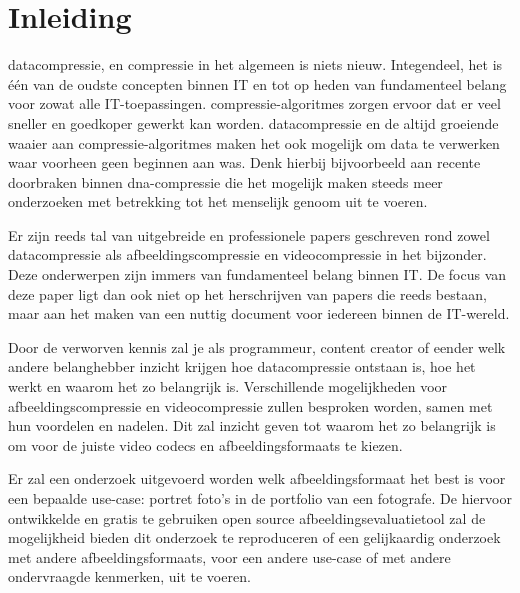 
\chapter{Inleiding}
\label{ch:inleiding}

\Gls{datacompressie}, en compressie in het algemeen is niets nieuw. Integendeel, het is één van de oudste concepten binnen IT en tot op heden van fundamenteel belang voor zowat alle IT-toepassingen. \Glspl{compressie-algoritme} zorgen ervoor dat er veel sneller en goedkoper gewerkt kan worden. \Gls{datacompressie} en de altijd groeiende waaier aan \glspl{compressie-algoritme} maken het ook mogelijk om data te verwerken waar voorheen geen beginnen aan was. Denk hierbij bijvoorbeeld aan recente doorbraken binnen \gls{dna-compressie} die het mogelijk maken steeds meer onderzoeken met betrekking tot het menselijk genoom uit te voeren.

Er zijn reeds tal van uitgebreide en professionele papers geschreven rond zowel \gls{datacompressie} als \gls{afbeeldingscompressie} en \gls{videocompressie} in het bijzonder. Deze onderwerpen zijn immers van fundamenteel belang binnen IT. De focus van deze paper ligt dan ook niet op het herschrijven van papers die reeds bestaan, maar aan het maken van een nuttig document voor iedereen binnen de IT-wereld. 

Door de verworven kennis zal je als programmeur, content creator of eender welk andere belanghebber inzicht krijgen hoe \gls{datacompressie} ontstaan is, hoe het werkt en waarom het zo belangrijk is. Verschillende mogelijkheden voor \gls{afbeeldingscompressie} en \gls{videocompressie} zullen besproken worden, samen met hun voordelen en nadelen. Dit zal inzicht geven tot waarom het zo belangrijk is om voor de juiste video \glspl{codec} en \glspl{afbeeldingsformaat} te kiezen.

Er zal een onderzoek uitgevoerd worden welk \gls{afbeeldingsformaat} het best is voor een bepaalde \gls{use-case}: portret foto's in de portfolio van een fotografe. De hiervoor ontwikkelde en gratis te gebruiken open source  \gls{afbeeldingsevaluatietool} zal de mogelijkheid bieden dit onderzoek te reproduceren of een gelijkaardig onderzoek met andere \glspl{afbeeldingsformaat}, voor een andere \gls{use-case} of met andere ondervraagde kenmerken, uit te voeren.

